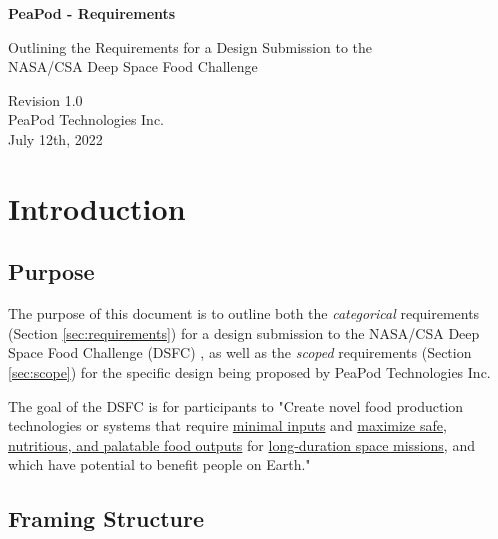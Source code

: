 \documentclass{../tex/report}
\begin{document}
\begin{titlepage}
    \begin{center}
        \vspace*{1.2cm}

        \textbf{\large{PeaPod - Requirements}}

        \vspace{0.5cm}

        Outlining the Requirements for a Design Submission to the \\NASA/CSA Deep Space Food Challenge

        \vfill
        
        \vspace{.75cm}

        Revision 1.0\\
        PeaPod Technologies Inc.\\
        July 12th, 2022

    \end{center}
\end{titlepage}

\thispagestyle{plain}

\tableofcontents
\clearpage

\section{Introduction}
\label{sec:intro}

\subsection{Purpose}
\label{sec:purpose}

The purpose of this document is to outline both the \textit{categorical} requirements (Section \ref{sec:requirements}) for a design submission to the NASA/CSA Deep Space Food Challenge (DSFC) \cite{dsfc}, as well as the \textit{scoped} requirements (Section \ref{sec:scope}) for the specific design being proposed by PeaPod Technologies Inc.

The goal of the DSFC is for participants to "Create novel food production technologies or systems that require \uline{minimal inputs} and \uline{maximize safe, nutritious, and palatable food outputs} for \uline{long-duration space missions}, and which have potential to benefit people on Earth." \cite{applicantguide}

\subsection{Framing Structure}
\label{sec:structure}
\end{document}
